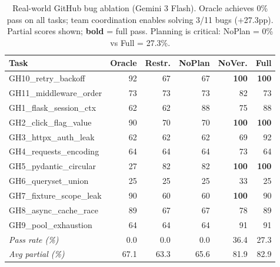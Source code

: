 \begin{table}[t]
\centering
\caption{Real-world GitHub bug ablation (Gemini 3 Flash). Oracle achieves 0\% pass on all tasks; team coordination enables solving 3/11 bugs (+27.3pp). Partial scores shown; \textbf{bold} = full pass. Planning is critical: NoPlan = 0\% vs Full = 27.3\%.}
\label{tab:gh_tasks}
\small
\begin{tabular}{lrrrrr}
\toprule
\textbf{Task} & \textbf{Oracle} & \textbf{Restr.} & \textbf{NoPlan} & \textbf{NoVer.} & \textbf{Full} \\
\midrule
GH10\_retry\_backoff & 92 & 67 & 67 & \textbf{100} & \textbf{100} \\
GH11\_middleware\_order & 73 & 73 & 73 & 82 & 73 \\
GH1\_flask\_session\_ctx & 62 & 62 & 88 & 75 & 88 \\
GH2\_click\_flag\_value & 90 & 70 & 70 & \textbf{100} & \textbf{100} \\
GH3\_httpx\_auth\_leak & 62 & 62 & 62 & 69 & 92 \\
GH4\_requests\_encoding & 64 & 64 & 64 & 73 & 64 \\
GH5\_pydantic\_circular & 27 & 82 & 82 & \textbf{100} & \textbf{100} \\
GH6\_queryset\_union & 25 & 25 & 25 & 33 & 25 \\
GH7\_fixture\_scope\_leak & 90 & 60 & 60 & \textbf{100} & 90 \\
GH8\_async\_cache\_race & 89 & 67 & 67 & 78 & 89 \\
GH9\_pool\_exhaustion & 64 & 64 & 64 & 91 & 91 \\
\midrule
\textit{Pass rate (\%)} & 0.0 & 0.0 & 0.0 & 36.4 & 27.3 \\
\textit{Avg partial (\%)} & 67.1 & 63.3 & 65.6 & 81.9 & 82.9 \\
\bottomrule
\end{tabular}
\end{table}